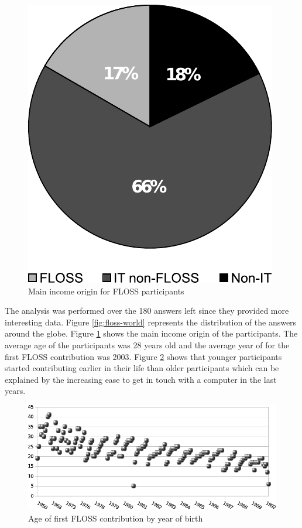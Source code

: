 \documentclass[lnbip]{svmultln}
\begin{document}
\begin{figure}[htb]
\begin{minipage}[t]{0.5\linewidth}
    \includegraphics[scale=0.8]{floss-income.pdf}
    \caption{Main income origin for FLOSS participants}
    \label{fig:floss-income}
  \end{minipage}
\end{figure}

The analysis was performed over the 180 answers left since they
provided more interesting data. Figure \ref{fig:floss-world}
represents the distribution of the answers around the globe. Figure
\ref{fig:floss-income} shows the main income origin of the
participants. The average age of the participants was 28 years old and
the average year of for the first FLOSS contribution was 2003. Figure
\ref{fig:floss-firstxp} shows that younger participants started
contributing earlier in their life than older participants which can
be explained by the increasing ease to get in touch with a computer in
the last years.

\begin{figure}[htb]
  \centering
  \includegraphics[scale=.9]{floss-firstxp.pdf}
  \caption{Age of first FLOSS contribution by year of birth}
  \label{fig:floss-firstxp}
\end{figure}
\end{document}
